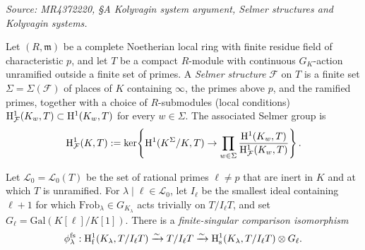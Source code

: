 \begin{definition}
  \label{def:selmer-triple}
  \textit{Source: MR4372220, §A Kolyvagin system argument, Selmer structures and Kolyvagin systems.}

  Let \((R, \mathfrak{m})\) be a complete Noetherian local ring with finite residue field of characteristic \(p\), and let \(T\) be a compact \(R\)-module with continuous \(G_K\)-action unramified outside a finite set of primes.
  A \emph{Selmer structure} \(\mathcal{F}\) on \(T\) is a finite set \(\Sigma = \Sigma(\mathcal{F})\) of places of \(K\) containing \(\infty\), the primes above \(p\), and the ramified primes, together with a choice of \(R\)-submodules (local conditions) \(\mathrm{H}^1_{\mathcal{F}}(K_w, T) \subset \mathrm{H}^1(K_w, T)\) for every \(w \in \Sigma\). The associated Selmer group is
  \[
    \mathrm{H}^1_{\mathcal{F}}(K, T) := \ker\!\left\{\mathrm{H}^1(K^\Sigma/K, T) \to \prod_{w \in \Sigma} \frac{\mathrm{H}^1(K_w, T)}{\mathrm{H}^1_{\mathcal{F}}(K_w, T)}\right\}.
  \]

  Let \(\mathcal{L}_0 = \mathcal{L}_0(T)\) be the set of rational primes \(\ell \neq p\) that are inert in \(K\) and at which \(T\) is unramified. For \(\lambda \mid \ell \in \mathcal{L}_0\), let \(I_\ell\) be the smallest ideal containing \(\ell + 1\) for which \(\mathrm{Frob}_\lambda \in G_{K_\lambda}\) acts trivially on \(T/I_\ell T\), and set \(G_\ell = \mathrm{Gal}(K[\ell]/K[1])\). There is a \emph{finite-singular comparison isomorphism}
  \[
    \phi_\lambda^{\mathrm{fs}} : \mathrm{H}^1_{\mathrm{f}}(K_\lambda, T/I_\ell T) \xrightarrow{\sim} T/I_\ell T \xrightarrow{\sim} \mathrm{H}^1_{\mathrm{s}}(K_\lambda, T/I_\ell T) \otimes G_\ell.
  \]


\end{definition}

